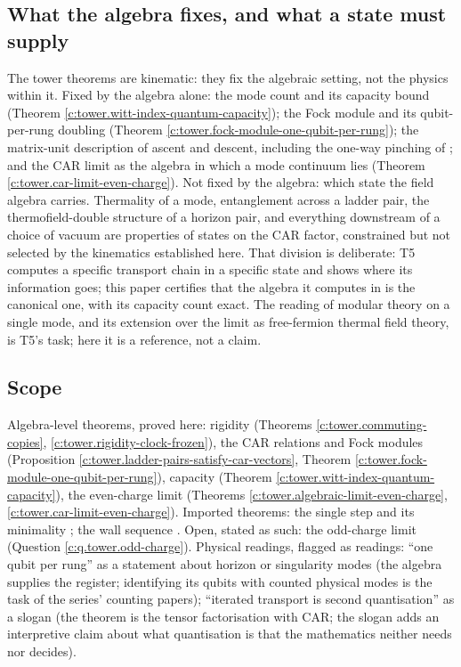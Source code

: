 \documentclass[11pt]{article}
\theoremstyle{definition}
\theoremstyle{plain}
\begin{document}
\subsection*{What the algebra fixes, and what a state must supply}
\label{c:note.tower.setting-what-algebra-fixes-what-state}
The tower theorems are kinematic: they fix the algebraic setting, not the physics within it. Fixed by the algebra alone: the mode count and its capacity bound (Theorem \ref{c:tower.witt-index-quantum-capacity}); the Fock module and its qubit-per-rung doubling (Theorem \ref{c:tower.fock-module-one-qubit-per-rung}); the matrix-unit description of ascent and descent, including the one-way pinching of \cite[\S7.3]{ButlerT1}; and the CAR limit as the algebra in which a mode continuum lies (Theorem \ref{c:tower.car-limit-even-charge}). Not fixed by the algebra: which state the field algebra carries. Thermality of a mode, entanglement across a ladder pair, the thermofield-double structure of a horizon pair, and everything downstream of a choice of vacuum are properties of states on the CAR factor, constrained but not selected by the kinematics established here. That division is deliberate: T5 \cite{ButlerT5} computes a specific transport chain in a specific state and shows where its information goes; this paper certifies that the algebra it computes in is the canonical one, with its capacity count exact. The reading of modular theory on a single mode, and its extension over the limit as free-fermion thermal field theory, is T5's task; here it is a reference, not a claim.

\subsection*{Scope}
\label{c:note.tower.setting-scope}
Algebra-level theorems, proved here: rigidity (Theorems \ref{c:tower.commuting-copies}, \ref{c:tower.rigidity-clock-frozen}), the CAR relations and Fock modules (Proposition \ref{c:tower.ladder-pairs-satisfy-car-vectors}, Theorem \ref{c:tower.fock-module-one-qubit-per-rung}), capacity (Theorem \ref{c:tower.witt-index-quantum-capacity}), the even-charge limit (Theorems \ref{c:tower.algebraic-limit-even-charge}, \ref{c:tower.car-limit-even-charge}). Imported theorems: the single step and its minimality \cite{ButlerT1}; the wall sequence \cite{ButlerT4}. Open, stated as such: the odd-charge limit (Question \ref{c:q.tower.odd-charge}). Physical readings, flagged as readings: ``one qubit per rung'' as a statement about horizon or singularity modes (the algebra supplies the register; identifying its qubits with counted physical modes is the task of the series' counting papers); ``iterated transport is second quantisation'' as a slogan (the theorem is the tensor factorisation with CAR; the slogan adds an interpretive claim about what quantisation is that the mathematics neither needs nor decides).
\end{document}
